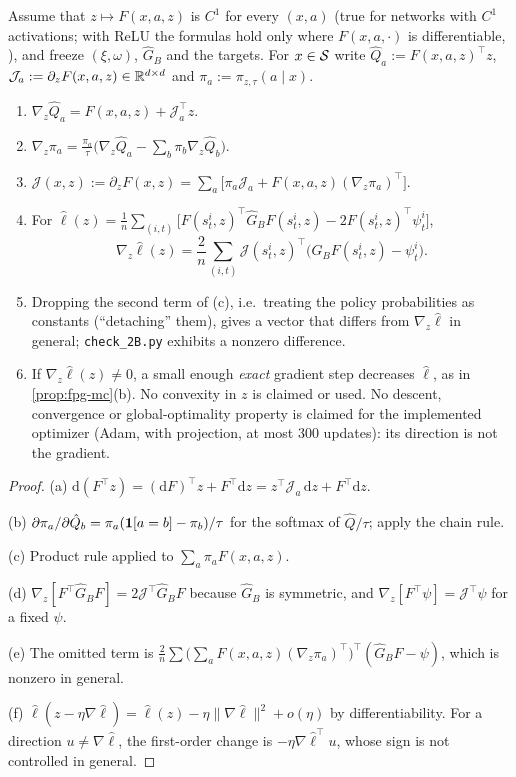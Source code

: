 \begin{proposition}\label{prop:fbil-grad}
Assume that $z\mapsto F(x,a,z)$ is $C^1$ for every $(x,a)$ (true for networks with $C^1$ activations; with ReLU the formulas hold only where $F(x,a,\cdot)$ is differentiable, ), and freeze $(\xi,\omega)$, $\hat G_B$ and the targets.
For $x\in\mathcal{S}$ write $\hat Q_a:=F(x,a,z)^\top z$, $\mathcal J_a:=\partial_zF(x,a,z)\in\mathbb{R}^{d\times d}$ and $\pi_a:=\pi_{z,\tau}(a\mid x)$.
\begin{enumerate}[nosep,label=(\alph*)]
\item $\nabla_z\hat Q_a=F(x,a,z)+\mathcal J_a^\top z$.
\item $\nabla_z\pi_a=\frac{\pi_a}\tau\big(\nabla_z\hat Q_a-\sum_b\pi_b\nabla_z\hat Q_b\big)$.
\item $\mathcal J(x,z):=\partial_zF(x,z)=\sum_a\big[\pi_a\mathcal J_a+F(x,a,z)(\nabla_z\pi_a)^\top\big]$.
\item For $\hat\ell(z)=\frac1n\sum_{(i,t)}\big[F(s^i_t,z)^\top\hat G_BF(s^i_t,z)-2F(s^i_t,z)^\top\psi^i_t\big]$,
  \begin{equation}\label{eq:fbil-grad}
  \nabla_z\hat\ell(z)=\frac2n\sum_{(i,t)}\mathcal J(s^i_t,z)^\top\big(\hat G_BF(s^i_t,z)-\psi^i_t\big).
  \end{equation}
\item Dropping the second term of (c), i.e.\ treating the policy probabilities as constants (``detaching'' them), gives a vector that differs from $\nabla_z\hat\ell$ in general; \texttt{check\_2B.py} exhibits a nonzero difference.
\item If $\nabla_z\hat\ell(z)\ne0$, a small enough \emph{exact} gradient step decreases $\hat\ell$, as in \cref{prop:fpg-mc}(b). No convexity in $z$ is claimed or used. No descent, convergence or global-optimality property is claimed for the implemented optimizer (Adam, with projection, at most 300 updates): its direction is not the gradient.
\end{enumerate}
\end{proposition}
\begin{proof}
(a) $\mathrm d(F^\top z)=(\mathrm dF)^\top z+F^\top\mathrm dz=z^\top\mathcal J_a\,\mathrm dz+F^\top\mathrm dz$.

(b) $\partial\pi_a/\partial\hat Q_b=\pi_a(\mathbf{1}[a=b]-\pi_b)/\tau$ for the softmax of $\hat Q/\tau$; apply the chain rule.

(c) Product rule applied to $\sum_a\pi_aF(x,a,z)$.

(d) $\nabla_z[F^\top\hat G_BF]=2\mathcal J^\top\hat G_BF$ because $\hat G_B$ is symmetric, and $\nabla_z[F^\top\psi]=\mathcal J^\top\psi$ for a fixed $\psi$.

(e) The omitted term is $\frac2n\sum\big(\sum_aF(x,a,z)(\nabla_z\pi_a)^\top\big)^\top(\hat G_BF-\psi)$, which is nonzero in general.

(f) $\hat\ell(z-\eta\nabla\hat\ell)=\hat\ell(z)-\eta\|\nabla\hat\ell\|^2+o(\eta)$ by differentiability. For a direction $u\ne\nabla\hat\ell$, the first-order change is $-\eta\nabla\hat\ell^\top u$, whose sign is not controlled in general.
\end{proof}

